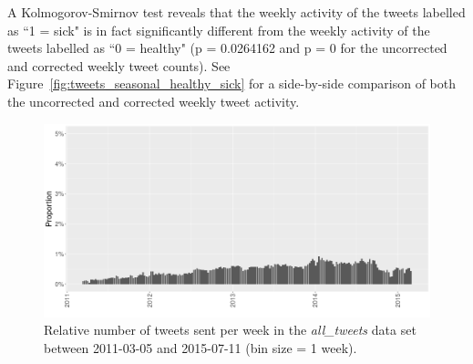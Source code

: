 \documentclass[11pt, a4paper,twoside]{report}\usepackage[]{graphicx}\usepackage[]{color}
\begin{document}
A Kolmogorov-Smirnov test reveals that the weekly activity of the tweets labelled as ``1 = sick" is in fact significantly different from the weekly activity of the tweets labelled as ``0 = healthy" (p = 0.0264162 and p = 0 for the uncorrected and corrected weekly tweet counts). See Figure~\ref{fig:tweets_seasonal_healthy_sick} for a side-by-side comparison of both the uncorrected and corrected weekly tweet activity.\newline

\begin{figure}[H]
\centering
\includegraphics[width=1\linewidth]{activity_total_date_Twitter_full_aggregated.png}
\caption{Relative number of tweets sent per week in the \textit{all\_tweets} data set between 2011-03-05 and 2015-07-11 (bin size = 1 week).}
\label{fig:tweets_seasonal_full}
\end{figure}
\end{document}
